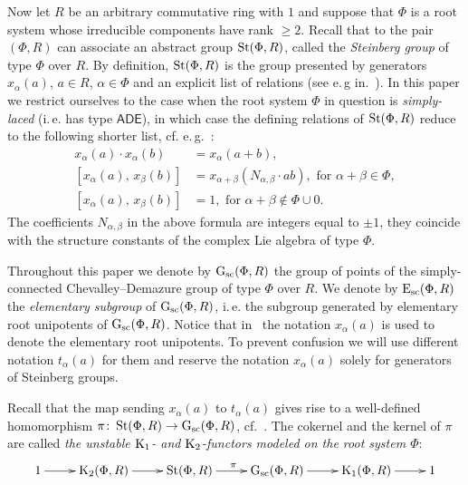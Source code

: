 Now let $R$ be an arbitrary commutative ring with $1$ and suppose that $\Phi$ is a root system whose irreducible components have rank $\geq 2$.
Recall that to the pair $(\Phi, R)$ can associate an abstract group $\operatorname{St}(\Phi, R)$, called the \textit{Steinberg group} of type $\Phi$ over $R$.
By definition, $\operatorname{St}(\Phi, R)$ is the group presented by generators $x_\alpha(a)$, $a \in R$, $\alpha \in \Phi$ and an explicit list of relations (see e.\,g in.~\cite{Ma69, St71}).
In this paper we restrict ourselves to the case when the root system $\Phi$ in question is \textit{simply-laced} (i.\,e. has type $\mathsf{ADE}$),
 in which case the defining relations of $\operatorname{St}(\Phi, R)$ reduce to the following shorter list, cf. e.\,g.~\cite[\S~2.2]{S15}:
\begin{align}
x_{\alpha}(a)\cdot x_{\alpha}(b)&=x_{\alpha}(a+b), \tag{R1} \label{x-additivity}\\
[x_{\alpha}(a),\,x_{\beta}(b)]  &=x_{\alpha+\beta}(N_{\alpha,\beta} \cdot ab),\text{ for }\alpha+\beta\in\Phi, \tag{R2} \label{R2} \\
[x_{\alpha}(a),\,x_{\beta}(b)]  &=1,\text{ for }\alpha+\beta\not\in\Phi\cup0. \tag{R3} \label{R3}
\end{align}
The coefficients $N_{\alpha,\beta}$ in the above formula are integers equal to $\pm 1$, they coincide with the structure constants of the complex Lie algebra of type $\Phi$.

Throughout this paper we denote by $\operatorname{G}_\mathrm{sc}(\Phi, R)$ the group of points of the simply-connected Chevalley--Demazure group of type $\Phi$ over $R$.
We denote by $\operatorname{E}_\mathrm{sc}(\Phi, R)$ the \textit{elementary subgroup} of $\operatorname{G}_\mathrm{sc}(\Phi, R)$, i.\,e. the subgroup generated by elementary root unipotents of $\operatorname{G}_\mathrm{sc}(\Phi, R)$.
Notice that in~\cite{Vav09, VP} the notation $x_\alpha(a)$ is used to denote the elementary root unipotents.
To prevent confusion we will use different notation $t_\alpha(a)$ for them and reserve the notation $x_\alpha(a)$ solely for generators of Steinberg groups.

Recall that the map sending $x_\alpha(a)$ to $t_\alpha(a)$ gives rise to a well-defined homomorphism $\pi \colon \operatorname{St}(\Phi, R) \to \operatorname{G}_\mathrm{sc}(\Phi, R)$, cf.~\cite[\S~1A]{St78}.
The cokernel and the kernel of $\pi$ are called \textit{the unstable $\operatorname{K}_1$- and $\operatorname{K}_2$-functors modeled on the root system $\Phi$}:
\begin{equation} \label{eq:K1-K2-sequence}
  \xymatrix{ 1 \ar[r] & \K_2(\Phi, R) \ar[r] & \St(\Phi, R) \ar[r]^{\pi} & \Gsc(\Phi, R) \ar[r] & \K_1(\Phi, R) \ar[r] & 1}
\end{equation}


